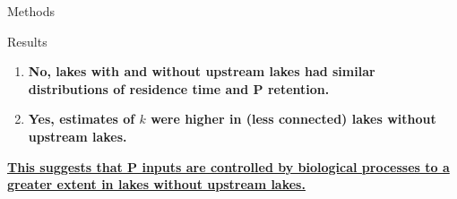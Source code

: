 \documentclass[final,hyperref={pdfpagelabels=false}]{beamer}
\begin{document}
\begin{frame}[t]
\begin{columns}[t]
\begin{column}{.465\textwidth}
\begin{block}{Methods}
\begin{itemize}
\end{itemize}


\end{block}

% 
% 
% 


\begin{block}{Results}
\begin{enumerate}
\item \textbf{No, lakes with and without upstream lakes had similar distributions of residence time and P retention.}
\vspace{1em}
\item \textbf{Yes, estimates of $k$ were higher in (less connected) lakes without upstream lakes.}
\end{enumerate}
\vspace{1em}
\large \textbf{\ul{This suggests that P inputs are controlled by biological processes to a greater extent in lakes without upstream lakes.}}


\end{block}
\end{column}
\end{columns}
\end{frame}
\end{document}
